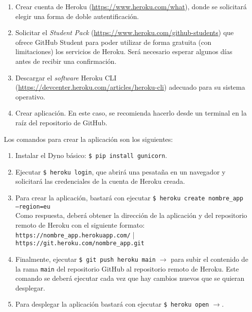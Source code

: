 \begin{enumerate}
    \item Crear cuenta de Heroku (\url{https://www.heroku.com/what}), donde se solicitará elegir una forma de doble autentificación.
    \item Solicitar el \textit{Student Pack} (\url{https://www.heroku.com/github-students}) que ofrece GitHub Student para poder utilizar de forma gratuita (con limitaciones) los servicios de Heroku. Será necesario esperar algunos días antes de recibir una confirmación.
    \item Descargar el \textit{software} Heroku CLI (\url{https://devcenter.heroku.com/articles/heroku-cli}) adecuado para su sistema operativo.
    \item Crear aplicación. En este caso, se recomienda hacerlo desde un terminal en la raíz del repositorio de GitHub.
\end{enumerate}

Los comandos para crear la aplicación son los siguientes:

\begin{enumerate}
    \item Instalar el Dyno básico: \texttt{\$ pip install gunicorn}.
    
    \item Ejecutar \texttt{\$ heroku login}, que abrirá una pesataña en un navegador y solicitará las credenciales de la cuenta de Heroku creada.
    
    \item Para crear la aplicación, bastará con ejecutar \texttt{\$ heroku create nombre\_app --region=eu} \\
    Como respuesta, deberá obtener la dirección de la aplicación y del repositorio remoto de Heroku con el siguiente formato: \\
    \texttt{https://nombre\_app.herokuapp.com/} | \\\texttt{https://git.heroku.com/nombre\_app.git}
    
    \item Finalmente, ejecutar \texttt{\$ git push heroku main} $\to$ para subir el contenido de la rama \texttt{main} del repositorio GitHub al repositorio remoto de Heroku. Este comando se deberá ejecutar cada vez que hay cambios nuevos que se quieran desplegar.
    
    \item Para desplegar la aplicación bastará con ejecutar \texttt{\$ heroku open} $\to$.
\end{enumerate}

